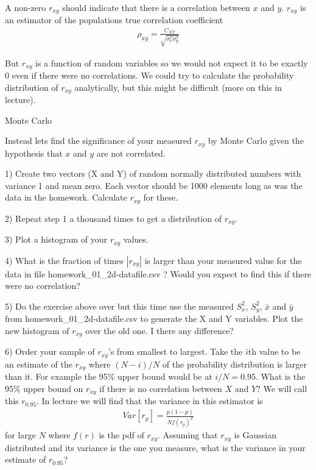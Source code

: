 \documentclass[11pt]{beamer}
\begin{document}
\begin{frame}
A non-zero $r_{xy}$ should indicate that there is a correlation between $x$ and $y$.
$r_{xy}$ is an estimator of the populations true correlation coefficient
\begin{align}
\rho_{xy} = \frac{C_{XY}}{\sqrt{\sigma^2_x \sigma_y^2} }
\end{align}

But $r_{xy}$ is a function of random variables so we would not expect it to be exactly 0 
even if there were no correlations.  We could try to calculate the probability distribution of 
$r_{xy}$ analytically, but this might be difficult (more on this in lecture).
\end{frame}
\begin{frame}
{\large Monte Carlo}

Instead lets find the significance of your measured $r_{xy}$ by Monte Carlo given the hypothesis that 
$x$ and $y$ are not correlated.

\vspace{1cm}
1) Create two vectors (X and Y) of random normally distributed numbers with variance 1 and mean zero.  Each vector should be 1000 elements long as was the data in the homework.  Calculate $r_{xy}$ for these.

\vspace{1cm}
2) Repeat step 1 a thousand times to get a distribution of $r_{xy}$.

\vspace{1cm}
3) Plot a histogram of your  $r_{xy}$ values.
\end{frame}
\begin{frame}
4) What is the fraction of times $|r_{xy}|$ is larger than your measured value for the data in file homework\_01\_2d-datafile.csv ?  Would you expect to find this if there were no correlation?

\vspace{1cm}

5) Do the exercise above over but this time use the measured $S^2_x$, $S^2_y$, $\bar{x}$ and $\bar{y}$ from homework\_01\_2d-datafile.csv  to generate the  X and Y variables.   Plot the new histogram of $r_{xy}$ over the old one.   I there any difference?
\end{frame}
\begin{frame}
6) Order your sample of $r_{xy}$'s from smallest to largest.  Take the $i$th value to be an estimate of the $r_{xy}$ where $(N-i)/N$ of the probability distribution is larger than it.  For example the 95\% upper bound would be at $i/N = 0.95$.  What is the 95\% upper bound on $r_{xy}$ if there is no correlation between $X$ and $Y$?  We will call this $r_{0.95}$.
In lecture we will find that the variance in this estimator is
\begin{align}
Var[r_p] = \frac{p (1-p) }{N f(r_p)^2 }
\end{align}
for large $N$ where $f(r)$ is the pdf of $r_{xy}$. 
Assuming that $r_{xy}$ is Gaussian distributed and its variance is the one you measure, what is the variance in your estimate of $r_{0.95}$?
\end{frame}
\end{document}
